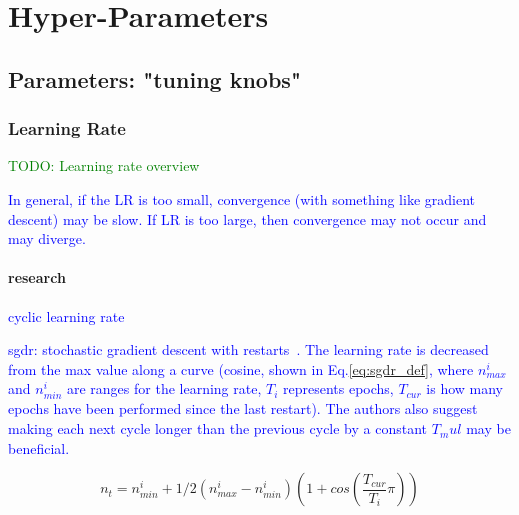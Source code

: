 \section{Hyper-Parameters}

\subsection{Parameters: "tuning knobs"}

\subsubsection{Learning Rate}

\textcolor{green}{TODO: Learning rate overview}




\textcolor{blue}{In general, if the LR is too small, convergence (with something like gradient descent) may be slow.  If LR is too large, then convergence may not occur and may diverge.}

\paragraph{research}


\textcolor{blue}{cyclic learning rate~\cite{smith2017cyclical}}

\textcolor{blue}{sgdr: stochastic gradient descent with restarts~\cite{loshchilov2016sgdr}. The learning rate is decreased from the max value along a curve (cosine, shown in Eq.\ref{eq:sgdr_def}, where $n_{max}^i$ and $n_{min}^i$ are ranges for the learning rate, $T_i$ represents epochs, $T_{cur}$ is how many epochs have been performed since the last restart). The authors also suggest making each next cycle longer than the previous cycle by a constant $T_mul$ may be beneficial.}

\begin{equation}
{n_t = n_{min}^i + 1/2(n_{max}^i - n_{min}^i)(1 + cos(\frac{T_{cur}}{T_i}\pi))}
\label{eq:sgdr_def}
\end{equation}

